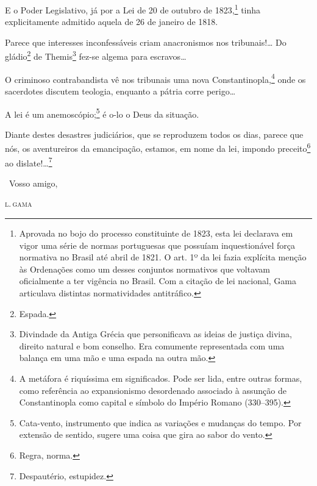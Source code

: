 {E o Poder Legislativo, já por a Lei de 20 de outubro de 1823,\footnote{
  Aprovada no bojo do processo constituinte de 1823, esta lei declarava
  em vigor uma série de normas portuguesas que possuíam inquestionável
  força normativa no Brasil até abril de 1821. O art. 1º da lei fazia
  explícita menção às Ordenações como um desses conjuntos normativos que
  voltavam oficialmente a ter vigência no Brasil. Com a citação de lei
  nacional, Gama articulava distintas normatividades
  antitráfico.} tinha
explicitamente admitido aquela de 26 de janeiro de 1818.

Parece que interesses inconfessáveis criam anacronismos nos
tribunais!\ldots{} Do gládio\footnote{Espada.} de Themis\footnote{
  Divindade da Antiga Grécia que personificava as ideias de justiça
  divina, direito natural e bom conselho. Era comumente representada com
  uma balança em uma mão e uma espada na outra mão.} fez-se algema para
escravos\ldots{}

O criminoso contrabandista vê nos tribunais uma nova Constantinopla,\footnote{A metáfora é riquíssima em significados. Pode ser lida, 
  entre outras formas, como referência ao expansionismo desordenado
  associado à assunção de Constantinopla como capital e símbolo do
  Império Romano (330--395).} onde os sacerdotes discutem teologia,
enquanto a pátria corre perigo\ldots{}

A lei é um anemoscópio;\footnote{Cata-vento, instrumento que indica as
  variações e mudanças do tempo. Por extensão de sentido, sugere uma
  coisa que gira ao sabor do vento.} é o-lo o Deus da situação.

Diante destes desastres judiciários, que se reproduzem todos os dias,
parece que nós, os aventureiros da emancipação, estamos, em nome da lei,
impondo preceito\footnote{Regra, norma.} ao dislate!\ldots{}\footnote{
  Despautério, estupidez.}

\medskip

\hfill\ Vosso amigo,

\hfill\textsc{l.\,gama}


}
